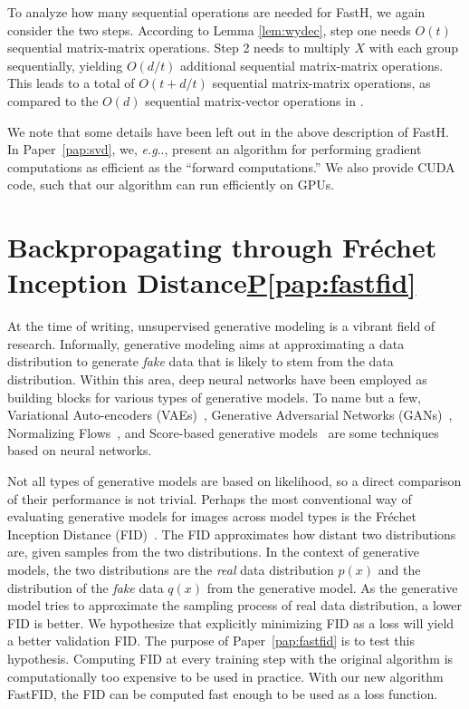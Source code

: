 \documentclass[11pt,a4paper,twoside,openright,final]{memoir}
\makeatletter
\DeclareRobustCommand\onedot{\futurelet\@let@token\@onedot}
\def\@onedot{\ifx\@let@token.\else.\null\fi\xspace}
\def\eg{\emph{e.g}\onedot} \def\Eg{\emph{E.g}\onedot}
\newcommand\contribution[1]{\hspace{0.5em}\hyperref[#1]{P\ref{#1}}}
\newcommand*{\paperref}[1]{Paper~\hyperref[#1]{\ref{#1}}}
\makeatother
\begin{document}
To analyze how many sequential operations are needed for FastH, we again consider the two steps.
According to Lemma \ref{lem:wydec}, step one needs $O(t)$ sequential matrix-matrix operations.
Step 2 needs to multiply $X$ with each group sequentially, yielding $O(d/t)$ additional sequential matrix-matrix operations.
This leads to a total of $O(t + d/t)$ sequential matrix-matrix operations, as compared to the $O(d)$ sequential matrix-vector operations in \cite{sequential}. 

We note that some details have been left out in the above description of FastH. 
In \paperref{pap:svd}, we, \eg, present an algorithm for performing gradient computations as efficient as the ``forward computations.''
We also provide CUDA code, such that our algorithm can run efficiently on GPUs.

\section[Backpropagating through Fr\'echet Inception Distance]{Backpropagating through Fr\'echet Inception Distance\contribution{pap:fastfid}} \label{sec:fid}
At the time of writing, unsupervised generative modeling is a vibrant field of research.
Informally, generative modeling aims at approximating a data distribution to generate \emph{fake} data that is likely to stem from the data distribution.
Within this area, deep neural networks have been employed as building blocks for various types of generative models.
To name but a few, Variational Auto-encoders (VAEs)~\cite{vae}, Generative Adversarial Networks (GANs)~\cite{gans}, Normalizing Flows~\cite{nice}, and Score-based generative models~\cite{sgm-stochastic-differential-equations} are some techniques based on neural networks.

Not all types of generative models are based on likelihood, so a direct comparison of their performance is not trivial.
Perhaps the most conventional way of evaluating generative models for images across model types is the Fr\'echet Inception Distance (FID)~\cite{fid, fid-comparison}. 
The FID approximates how distant two distributions are, given samples from the two distributions. 
In the context of generative models, the two distributions are the \emph{real} data distribution $p(x)$ and the distribution of the \emph{fake} data $q(x)$ from the generative model.
As the generative model tries to approximate the sampling process of real data distribution, a lower FID is better.
We hypothesize that explicitly minimizing FID as a loss will yield a better validation FID.
The purpose of \paperref{pap:fastfid} is to test this hypothesis.
Computing FID at every training step with the original algorithm is computationally too expensive to be used in practice.
With our new algorithm FastFID, the FID can be computed fast enough to be used as a loss function. 
\end{document}

